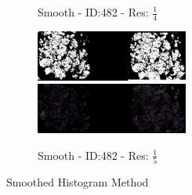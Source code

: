 \documentclass[letterpaper,10pt,oneside]{article}
\begin{document}
\begin{figure}[hbtp]
\begin{subfigure}[b]{5cm}
    \caption{Smooth - ID:482 - Res: $\frac{1}{4}$}
  \end{subfigure}
  \begin{subfigure}[b]{5cm}
    \includegraphics[width=5cm]{visualization/results/smoothhistogram/res_reduce_5/Region_0_PO14-00482B3_1_2_201404171123.png}
    \includegraphics[width=5cm]{visualization/results/smoothhistogram/res_reduce_5/Region_1_PO14-00482B3_1_2_201404171123.png}
    \caption{Smooth - ID:482 - Res: $\frac{1}{5}$}
  \end{subfigure}
  \caption{Smoothed Histogram Method}
\end{figure}
\end{document}
